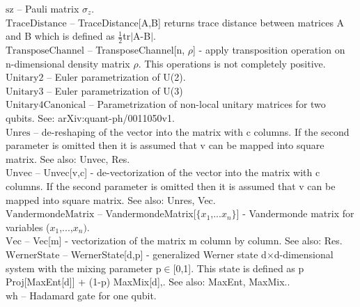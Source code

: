 \documentclass[a4paper,10pt]{scrartcl}
\begin{document}
\textbf{$ \text{sz} $ }-- Pauli matrix $ \sigma _z. $\\

\textbf{$ \text{TraceDistance} $ }-- TraceDistance[A,B] returns trace distance between matrices A and B which is defined as $ \frac{1}{2} $tr$|$A-B$|$.$  $\\

\textbf{$ \text{TransposeChannel} $ }-- TransposeChannel[n, $\rho $] - apply transposition operation on n-dimensional density matrix $\rho $. This operations is not completely positive.$  $\\

\textbf{$ \text{Unitary2} $ }-- Euler parametrization of U(2).$  $\\

\textbf{$ \text{Unitary3} $ }-- Euler parametrization of U(3)$  $\\

\textbf{$ \text{Unitary4Canonical} $ }-- Parametrization of non-local unitary matrices for two qubits. See: arXiv:quant-ph/0011050v1.$  $\\

\textbf{$ \text{Unres} $ }-- de-reshaping of the vector into the matrix with c columns. If the second parameter is omitted then it is assumed that v can be mapped into square matrix. See also: Unvec, Res.$  $\\

\textbf{$ \text{Unvec} $ }-- Unvec[v,c] - de-vectorization of the vector into the matrix with c columns. If the second parameter is omitted then it is assumed that v can be mapped into square matrix. See also: Unres, Vec.$  $\\

\textbf{$ \text{VandermondeMatrix} $ }-- VandermondeMatrix[$\{$$ x_1\text{,...}x_n $$\}$] - Vandermonde matrix for variables ($ x_1 $,...,$ x_n\text{).} $\\

\textbf{$ \text{Vec} $ }-- Vec[m] - vectorization of the matrix m column by column. See also: Res.$  $\\

\textbf{$ \text{WernerState} $ }-- WernerState[d,p] - generalized Werner state d$\times $d-dimensional system with the mixing parameter p$\in $[0,1]. This state is defined as p Proj[MaxEnt[d]] + (1-p) MaxMix[d],. See also: MaxEnt, MaxMix..$  $\\

\textbf{$ \text{wh} $ }-- Hadamard gate for one qubit.$  $\\
\end{document}
